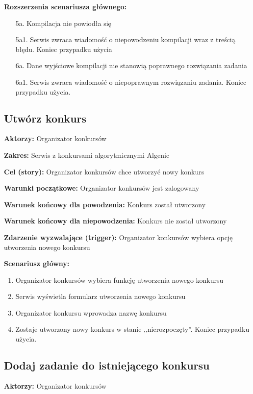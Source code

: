 \documentclass{article}
\begin{document}
\textbf{Rozszerzenia scenariusza głównego:}
\begin{itemize}
	\item[5a.] Kompilacja nie powiodła się
	\item[5a1.] Serwis zwraca wiadomość o niepowodzeniu kompilacji wraz z treścią błędu. Koniec przypadku użycia
	\item[6a.] Dane wyjściowe kompilacji nie stanowią poprawnego rozwiązania zadania
	\item[6a1.] Serwis zwraca wiadomość o niepoprawnym rozwiązaniu zadania. Koniec przypadku użycia.
\end{itemize}

\newpage
\subsection{Utwórz konkurs}

\textbf{Aktorzy:} Organizator konkursów

\textbf{Zakres:} Serwis z konkursami algorytmicznymi Algenic

\textbf{Cel (story):} Organizator konkursów chce utworzyć nowy konkurs

\textbf{Warunki początkowe:} Organizator konkursów jest zalogowany

\textbf{Warunek końcowy dla powodzenia:} Konkurs został utworzony

\textbf{Warunek końcowy dla niepowodzenia:} Konkurs nie został utworzony

\textbf{Zdarzenie wyzwalające (trigger):} Organizator konkursów wybiera opcję utworzenia nowego konkursu

\textbf{Scenariusz główny:}
\begin{enumerate}
	\item Organizator konkursów wybiera funkcję utworzenia nowego konkursu
	\item Serwis wyświetla formularz utworzenia nowego konkursu
	\item Organizator konkursu wprowadza nazwę konkursu
	\item Zostaje utworzony nowy konkurs w stanie ,,nierozpoczęty''. Koniec przypadku użycia.
\end{enumerate}


\subsection{Dodaj zadanie do istniejącego konkursu}

\textbf{Aktorzy:} Organizator konkursów  
\end{document}
